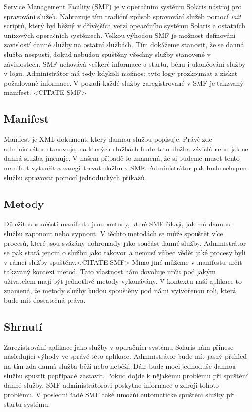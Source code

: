 Service Management Facility (SMF) je v operačním systému Solaris nástroj pro spravování služeb. Nahrazuje tím tradiční způsob spravování služeb pomocí \emph{init} scriptů, který byl běžný v dřívějších verzí opearčního systému Solaris a ostatních unixových operačních systémech. Velkou výhodou SMF je možnost definování zavislostí danné služby na ostatní službách. Tím dokážeme stanovit, že se danná služba nespustí, dokud nebudou spuštěny všechny služby stanovené v závislostech. SMF uchovává veškeré informace o startu, běhu i ukončování služby v logu. Administrátor má tedy kdykoli možnost tyto logy prozkoumat a získat požadované informace. V pozadí každé služby zaregistrované v SMF je takzvaný manifest. <CITATE SMF>
    \subsection{Manifest}
    Manifest je XML dokument, který dannou službu popisuje. Právě zde administrátor stanovuje, na kterých službách bude tato služba závislá nebo jak se danná služba jmenuje. V našem případě to znamená, že si budeme muset tento manifest vytvořit a zaregistrovat službu v SMF. Administrátor pak bude schopen službu spravovat pomocí jednoduchých příkazů.
    \subsection{Metody}
    Důležitou součástí manifestu jsou metody, které SMF říkají, jak má dannou službu zaponout nebo vypnout. V těchto metodách se může spouštět více procesů, které jsou svázány dohromady jako součást danné služby. Administrátor se pak stará jenom o službu jako takovou a nemusí vůbec vědět jaké procesy byli v rámci služby spuštěny.<CITATE SMF> Mimo jiné můžeme v manifestu určit takzvaný kontext metod. Tato vlastnost nám dovoluje určit pod jakým uživatelem mají být jednotlivé metody vykonávány. V kontextu naší aplikace to znamená, že metody služby budou spouštěny pod námi vytvořenou rolí, která bude mít dostatečná práva.
    \subsection{Shrnutí}
    Zaregistrování aplikace jako služby v operačním systému Solaris nám přinese následující výhody ve správě této aplikace. Administrátor bude mít jasný přehled na tím zda danná služba běží nebo neběží. Dále bude moci jednoduše dannou službu spustit popřípadě zastavit. Pokud dojde k nějakému problému při spuštění danné služby, SMF administrátorovi poskytne informace o zdroji tohoto problému. V poslední řadě SMF také umožňí automatické spuštění služby při startu systému.


